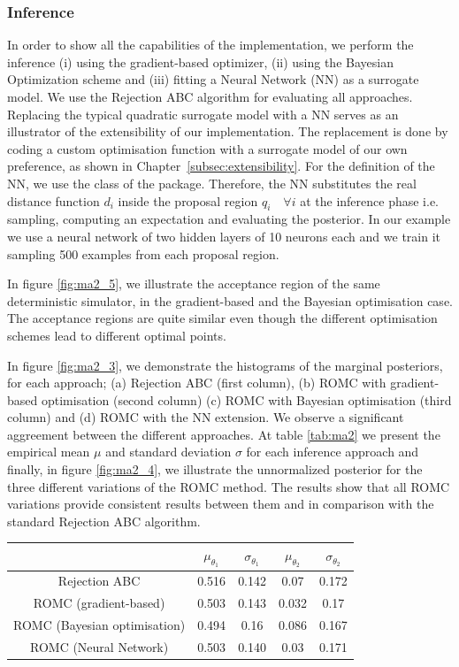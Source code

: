 \subsubsection*{Inference}

In order to show all the capabilities of the implementation, we
perform the inference (i) using the gradient-based optimizer, (ii)
using the Bayesian Optimization scheme and (iii) fitting a Neural
Network (NN) as a surrogate model. We use the Rejection ABC algorithm
for evaluating all approaches. Replacing the typical quadratic
surrogate model with a NN serves as an illustrator of the
extensibility of our implementation. The replacement is done by coding
a custom optimisation function with a surrogate model of our own
preference, as shown in Chapter~\ref{subsec:extensibility}. For the
definition of the NN, we use the  class of the
 package. Therefore, the NN substitutes the real
distance function \(d_i\) inside the proposal region
\(q_i \quad \forall i\) at the inference phase i.e. sampling,
computing an expectation and evaluating the posterior. In our example
we use a neural network of two hidden layers of 10 neurons each and we
train it sampling 500 examples from each proposal region.

In figure \ref{fig:ma2_5}, we illustrate the acceptance region of the
same deterministic simulator, in the gradient-based and the Bayesian
optimisation case. The acceptance regions are quite similar even though the
different optimisation schemes lead to different optimal points.

In figure \ref{fig:ma2_3}, we demonstrate the histograms of the
marginal posteriors, for each approach; (a) Rejection ABC (first
column), (b) ROMC with gradient-based optimisation (second column) (c)
ROMC with Bayesian optimisation (third column) and (d) ROMC with the
NN extension. We observe a significant aggreement between the
different approaches. At table \ref{tab:ma2} we present the empirical
mean \(\mu\) and standard deviation \(\sigma\) for each inference
approach and finally, in figure \ref{fig:ma2_4}, we illustrate the
unnormalized posterior for the three different variations of the ROMC
method. The results show that all ROMC variations provide consistent
results between them and in comparison with the standard Rejection ABC
algorithm.

\begin{center} \label{tab:ma2}
\begin{tabular}{ c|c|c|c|c }
\hline
& \(\mu_{\theta_1}\) & \(\sigma_{\theta_1}\) & \(\mu_{\theta_2}\) & \(\sigma_{\theta_2}\) \\
\hline \hline
Rejection ABC & 0.516 & 0.142 & 0.07 & 0.172 \\
\hline
ROMC (gradient-based) & 0.503 & 0.143 & 0.032 & 0.17 \\
\hline
ROMC (Bayesian optimisation) & 0.494 & 0.16 & 0.086 & 0.167 \\
\hline
ROMC (Neural Network) & 0.503 & 0.140 & 0.03 & 0.171 \\
\hline
\end{tabular}
\end{center}

